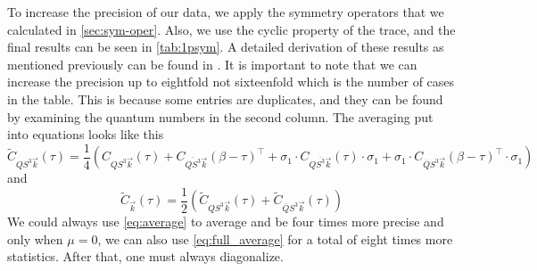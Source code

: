 To increase the precision of our data, we apply the symmetry operators that we calculated in  \cref{sec:sym-oper}. Also, we use the cyclic property of the trace, and the final results can be seen in \cref{tab:1psym}. A detailed derivation of these results as mentioned previously can be found in \cite{evan}. It is important to note that we can increase the precision up to eightfold not sixteenfold which is the number of cases in the table. This is because some entries are duplicates, and they can be found by examining the quantum numbers in the second column. The averaging put into equations looks like this
\begin{equation}
  \tilde{C}_{QS^3\vec{k}}(\tau) = \frac{1}{4}\left( C_{QS^3\vec{k}}(\tau) + C_{\overline{QS^3}\vec{k}}(\beta-\tau)^\top + \sigma_1\cdot C_{Q\overline{S^3}\vec{k}}(\tau) \cdot\sigma_1 + \sigma_1\cdot C_{\overline{Q}S^3\vec{k}}(\beta-\tau)^\top \cdot\sigma_1 \right)
  \label{eq:average}
\end{equation}
and
\begin{equation}
  \tilde{C}_{\vec{k}}(\tau) = \frac{1}{2}\left( \tilde{C}_{QS^3\vec{k}}(\tau) + \tilde{C}_{\overline{Q}S^3\vec{k}}(\tau) \right)
  \label{eq:full_average}
\end{equation}
We could always use \cref{eq:average} to average and be four times more precise and only when $\mu = 0$, we can also use \cref{eq:full_average} for a total of eight times more statistics. After that, one must always diagonalize.


